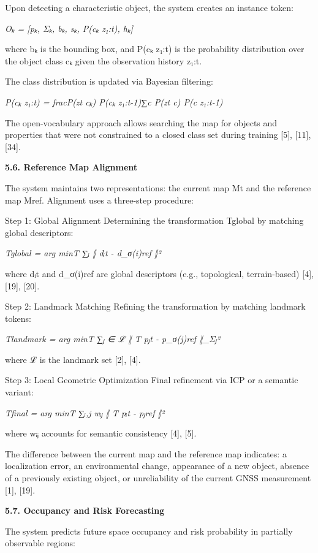 \documentclass[
]{article}
\begin{document}
Upon detecting a characteristic object, the system creates an instance
token:

\emph{Oₖ = {[}pₖ, Σₖ, bₖ, sₖ, P(cₖ \textbar{} z₁:t), hₖ{]}}

where bₖ is the bounding box, and P(cₖ \textbar{} z₁:t) is the
probability distribution over the object class cₖ given the observation
history z₁:t.

The class distribution is updated via Bayesian filtering:

\emph{P(cₖ \textbar{} z₁:t) = fracP(zt \textbar{} cₖ) P(cₖ \textbar{}
z₁:t-1)∑c\textquotesingle{} P(zt \textbar{} c\textquotesingle)
P(c\textquotesingle{} \textbar{} z₁:t-1)}

The open-vocabulary approach allows searching the map for objects and
properties that were not constrained to a closed class set during
training {[}5{]}, {[}11{]}, {[}34{]}.

\textbf{5.6. Reference Map Alignment}

The system maintains two representations: the current map Mt and the
reference map Mref. Alignment uses a three-step procedure:

Step 1: Global Alignment Determining the transformation Tglobal by
matching global descriptors:

\emph{Tglobal = arg minT ∑ᵢ ‖ dᵢt - d\_σ(i)ref ‖²}

where dᵢt and d\_σ(i)ref are global descriptors (e.g., topological,
terrain-based) {[}4{]}, {[}19{]}, {[}20{]}.

Step 2: Landmark Matching Refining the transformation by matching
landmark tokens:

\emph{Tlandmark = arg minT ∑ⱼ ∈ ℒ ‖ T pⱼt - p\_σ(j)ref ‖\_Σⱼ²}

where ℒ is the landmark set {[}2{]}, {[}4{]}.

Step 3: Local Geometric Optimization Final refinement via ICP or a
semantic variant:

\emph{Tfinal = arg minT ∑ᵢ,j wᵢⱼ ‖ T pᵢt - pⱼref ‖²}

where wᵢⱼ accounts for semantic consistency {[}4{]}, {[}5{]}.

The difference between the current map and the reference map indicates:
a localization error, an environmental change, appearance of a new
object, absence of a previously existing object, or unreliability of the
current GNSS measurement {[}1{]}, {[}19{]}.

\textbf{5.7. Occupancy and Risk Forecasting}

The system predicts future space occupancy and risk probability in
partially observable regions:
\end{document}
